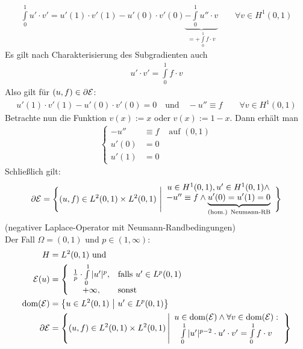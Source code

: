 \begin{beispiel}
\begin{align*}
\int\limits_0^1 u'\cdot v'=u'(1)\cdot v'(1)-u'(0)\cdot v'(0)\underbrace{-\int\limits_0^1 u''\cdot v}_{=+\int\limits_0^1 f\cdot v}\qquad\forall v\in H^1(0,1)
\end{align*}
Es gilt nach Charakterisierung des Subgradienten auch 
\begin{align*}
u'\cdot v'=\int\limits_0^1 f\cdot v
\end{align*}
Also gilt für $(u,f)\in \partial\mathcal{E}$:
\begin{align*}
u'(1)\cdot v'(1)-u'(0)\cdot v'(0)=0\quad\text{und}\quad -u''\equiv f
\qquad\forall v\in H^1(0,1)
\end{align*}
Betrachte nun die Funktion $v(x):=x$ oder $v(x):=1-x$. Dann erhält man 
\begin{align*}
\left\lbrace\begin{array}{rll}
-u'' &\equiv f &\text{ auf }(0,1)\\
u'(0)&=0\\
u'(1)&=0
\end{array}\right.
\end{align*}
Schließlich gilt:
\begin{align*}
\partial\mathcal{E}=\Bigg\lbrace(u,f)\in L^2(0,1)\times L^2(0,1)~\Bigg|
\begin{array}{c}
u\in H^1(0,1),u'\in H^1(0,1)\wedge\\
-u''\equiv f\wedge \underbrace{u'(0)=u'(1)=0}_{\text{(hom.) Neumann-RB}}
\end{array}
\Bigg\rbrace
\end{align*}
(negativer Laplace-Operator mit Neumann-Randbedingungen)\\
Der Fall $\Omega=(0,1)$ und $p\in(1,\infty)$:
\begin{align*}
H&=L^2(0,1)\text{ und }\\
\mathcal{E}(u)&=\left\lbrace\begin{array}{cl}
\frac{1}{p}\cdot\int\limits_0^1 |u'|^p, &\text{falls } u'\in L^p(0,1)\\
+\infty, &\text{sonst }
\end{array}\right.\\
\text{dom}(\mathcal{E})&=\big\lbrace u\in L^2(0,1)~\big|~u'\in L^p(0,1)\big\rbrace\\
\partial\mathcal{E}&=\left\lbrace(u,f)\in L^2(0,1)\times L^2(0,1)\left|
\begin{array}{c}
u\in\text{dom}(\mathcal{E})\wedge\forall v\in\text{dom}(\mathcal{E}):\\
\int\limits_0^1|u'|^{p-2}\cdot u'\cdot v'=\int\limits_0^1 f\cdot v
\end{array}
\right.\right\rbrace
\end{align*}

\end{beispiel}
